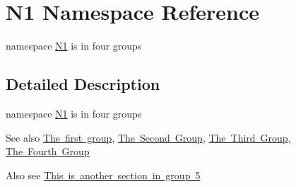 \hypertarget{namespace_n1}{}\section{N1 Namespace Reference}
\label{namespace_n1}


namespace \mbox{\hyperlink{namespace_n1}{N1}} is in four groups  




\subsection{Detailed Description}
namespace \mbox{\hyperlink{namespace_n1}{N1}} is in four groups 

\begin{DoxySeeAlso}{See also}
\mbox{\hyperlink{group__group1}{The first group}}, \mbox{\hyperlink{group__group2}{The Second Group}}, \mbox{\hyperlink{group__group3}{The Third Group}}, \mbox{\hyperlink{group__group4}{The Fourth Group}}
\end{DoxySeeAlso}
Also see \mbox{\hyperlink{group__group5}{This is another section in group 5}} 